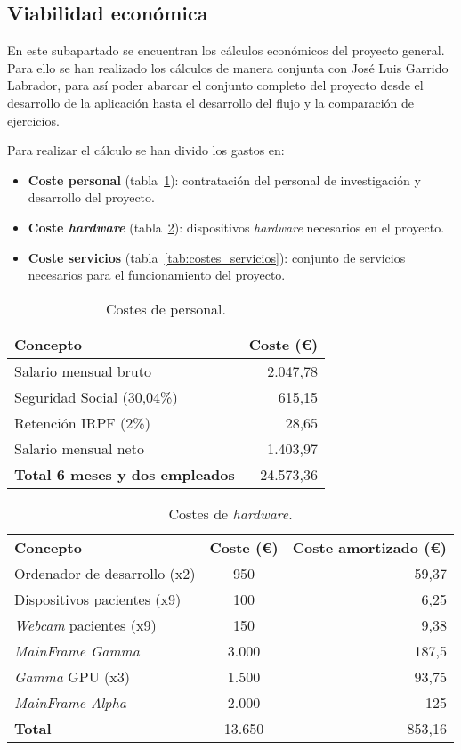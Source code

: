 \subsection{Viabilidad económica}

En este subapartado se encuentran los cálculos económicos del proyecto general. Para ello se han realizado los cálculos de manera conjunta con José Luis Garrido Labrador, para así poder abarcar el conjunto completo del proyecto desde el desarrollo de la aplicación hasta el desarrollo del flujo y la comparación de ejercicios.

Para realizar el cálculo se han divido los gastos en:
\begin{itemize}
	\item \textbf{Coste personal} (tabla~\ref{tab:costes_personal}): contratación del personal de investigación y desarrollo del proyecto.
	\item \textbf{Coste \textit{hardware}} (tabla~\ref{tab:costes_hardware}): dispositivos \textit{hardware} necesarios en el proyecto.
	\item \textbf{Coste servicios} (tabla~\ref{tab:costes_servicios}): conjunto de servicios necesarios para el funcionamiento del proyecto.
\end{itemize}

\begin{table}\centering
	\begin{tabular}[]{@{}l r@{}}
		\toprule
		\textbf{Concepto} & \textbf{Coste (\euro{})} \\
		\midrule
		Salario mensual bruto~\cite{salariales} & 2.047,78 \\
		Seguridad Social (30,04\%) & 615,15 \\
		Retención IRPF (2\%) & 28,65 \\
		Salario mensual neto & 1.403,97 \\\hubu
		\textbf{Total 6 meses y dos empleados} &  24.573,36 \\
		\bottomrule
	\end{tabular}
	\caption{Costes de personal.}
	\label{tab:costes_personal}
\end{table}

\begin{table}
	\centering
	\begin{tabular}[]{@{}l c r@{}}
		\toprule
		\textbf{Concepto} & \textbf{Coste (\euro{})} & \textbf{Coste amortizado (\euro{})} \\
		\otoprule
		Ordenador de desarrollo (x2) & 950 &  59,37\\
		Dispositivos pacientes (x9) & 100 & 6,25\\
		\textit{Webcam} pacientes (x9) & 150 &9,38\\
		\textit{MainFrame Gamma}  & 3.000 & 187,5 \\ 
		\textit{Gamma} GPU (x3) & 1.500 &  93,75\\
		\textit{MainFrame Alpha}  & 2.000 & 125 \\\hubu
		\textbf{Total} & 13.650 & 853,16\\
		\bottomrule
	\end{tabular}
	\caption{Costes de \textit{hardware}.}
	\label{tab:costes_hardware}
\end{table}

